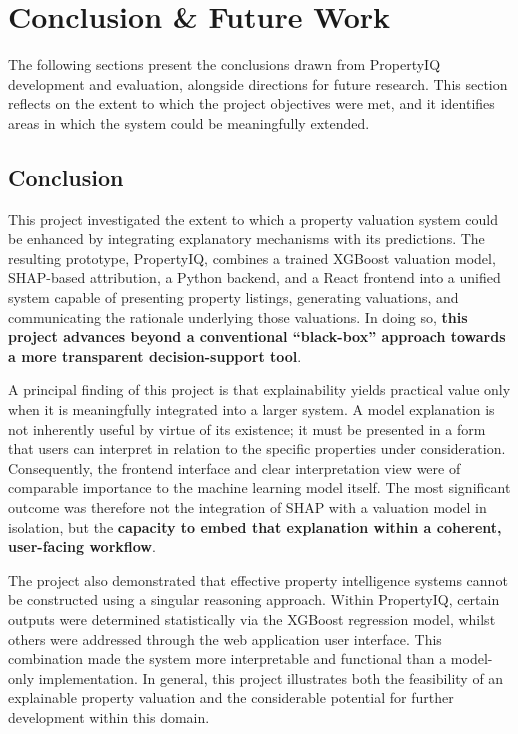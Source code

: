 \chapter{Conclusion \& Future Work}
\label{ch:Conclusion}

The following sections present the conclusions drawn from PropertyIQ development and evaluation, alongside directions for future research. This section reflects on the extent to which the project objectives were met, and it identifies areas in which the system could be meaningfully extended.


\section{Conclusion}
\label{se:Conclusion}

This project investigated the extent to which a property valuation system could be enhanced by integrating explanatory mechanisms with its predictions. The resulting prototype, PropertyIQ, combines a trained XGBoost valuation model, SHAP-based attribution, a Python backend, and a React frontend into a unified system capable of presenting property listings, generating valuations, and communicating the rationale underlying those valuations. In doing so, \textbf{this project advances beyond a conventional ``black-box'' approach towards a more transparent decision-support tool}.

A principal finding of this project is that explainability yields practical value only when it is meaningfully integrated into a larger system. A model explanation is not inherently useful by virtue of its existence; it must be presented in a form that users can interpret in relation to the specific properties under consideration. Consequently, the frontend interface and clear interpretation view were of comparable importance to the machine learning model itself. The most significant outcome was therefore not the integration of SHAP with a valuation model in isolation, but the \textbf{capacity to embed that explanation within a coherent, user-facing workflow}.

The project also demonstrated that effective property intelligence systems cannot be constructed using a singular reasoning approach. Within PropertyIQ, certain outputs were determined statistically via the XGBoost regression model, whilst others were addressed through the web application user interface. This combination made the system more interpretable and functional than a model-only implementation. In general, this project illustrates both the feasibility of an explainable property valuation and the considerable potential for further development within this domain.


